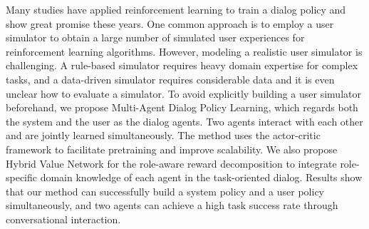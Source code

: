 Many studies have applied reinforcement learning to train a dialog policy and show great promise these years. One common approach is to employ a user simulator to obtain a large number of simulated user experiences for reinforcement learning algorithms. However, modeling a realistic user simulator is challenging. A rule-based simulator requires heavy domain expertise for complex tasks, and a data-driven simulator requires considerable data and it is even unclear how to evaluate a simulator. To avoid explicitly building a user simulator beforehand, we propose Multi-Agent Dialog Policy Learning, which regards both the system and the user as the dialog agents. Two agents interact with each other and are jointly learned simultaneously. The method uses the actor-critic framework to facilitate pretraining and improve scalability. We also propose Hybrid Value Network for the role-aware reward decomposition to integrate role-specific domain knowledge of each agent in the task-oriented dialog. Results show that our method can successfully build a system policy and a user policy simultaneously, and two agents can achieve a high task success rate through conversational interaction.
